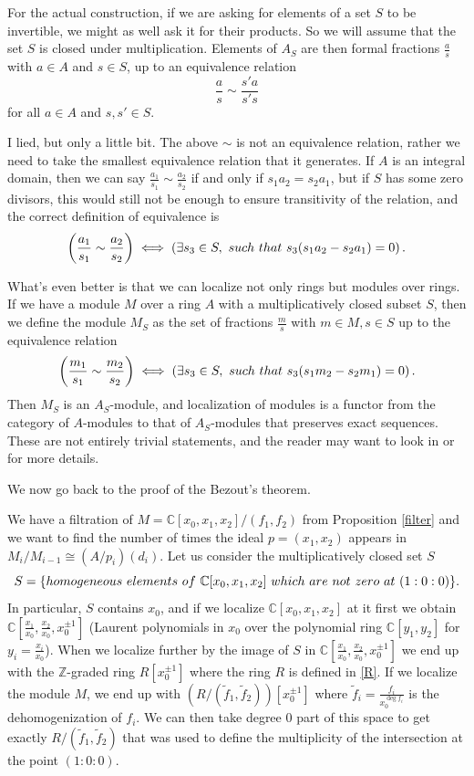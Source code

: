 \documentclass[11pt]{article}
\numberwithin{equation}{section}
\numberwithin{footnote}{section}
\newcommand{\blue}{\color{blue}}
\newcommand{\Z}{{\mathbb Z}}
\newcommand{\C}{{\mathbb C}}
\begin{document}
For the actual construction, if we are asking for elements of a set $S$ to be invertible, we might as well ask it for their products. So we will assume that the set $S$ is closed under multiplication. Elements of $A_S$ are then formal fractions $\frac as$ with $a\in A$ and $s\in S$, up to an equivalence relation
$$
\frac as \sim \frac {s'a}{s's}
$$
for all $a\in A$ and $s,s'\in S$.

\smallskip
{\blue I lied, but only a little bit.} The above $\sim$ is not an equivalence relation, rather we need to take the smallest equivalence relation that it generates. If $A$ is an integral domain, then we can say $\frac {a_1}{s_1} \sim \frac {a_2}{s_2}$ if and only if $s_1a_2 = s_2a_1$, but if $S$ has some zero divisors, this would still not be enough to ensure transitivity of the relation, and the correct definition of equivalence is
\begin{align*}
\left(\frac {a_1}{s_1} \sim \frac {a_2}{s_2}\right) \iff \left( \exists s_3\in S,~{\rm such~that~}s_3(s_1a_2 - s_2a_1)=0   \right).
\end{align*}

\smallskip
What's even better is that we can localize not only rings but modules over rings. If we have a module $M$ over a ring $A$ with a multiplicatively closed subset $S$, then we define the module $M_S$ as the set of fractions $\frac ms$ with $m\in M, s\in S$ up to the equivalence relation 
\begin{align}\label{locm}
\left(\frac {m_1}{s_1} \sim \frac {m_2}{s_2}\right) \iff \left( \exists s_3\in S,~{\rm such~that~}s_3(s_1m_2 - s_2m_1)=0   \right).
\end{align}
Then $M_S$ is an $A_S$-module, and localization of modules is a functor from the category of $A$-modules to that of $A_S$-modules that preserves exact sequences. These are not entirely trivial statements, and the reader may want to look in \cite{AM} or \cite{Eisenbud} for more details.

\smallskip{\blue \hrule}

\smallskip
We now go back to the proof of the Bezout's theorem. 

\smallskip
We have a filtration of $M = \C[x_0,x_1,x_2]/(f_1,f_2)$ from Proposition \ref{filter} and we want to find the number of times the ideal $p=(x_1,x_2)$ appears in $M_i/M_{i-1} \cong (A/p_i)(d_i)$. Let us consider the multiplicatively closed set $S$
$$
S=\{{\rm homogeneous~elements~of~}\C[x_0,x_1,x_2]{\rm~ which ~are~ not~ zero~at~} (1:0:0)\}.
$$
In particular, $S$ contains $x_0$, and if we localize $\C[x_0,x_1,x_2]$ at it first we obtain $\C[\frac {x_1}{x_0},\frac {x_2}{x_0},x_0^{\pm 1}]$ (Laurent polynomials in $x_0$ over the polynomial ring $\C[y_1,y_2]$ for $y_i=\frac {x_i}{x_0}$). When we localize further by the image of $S$ in $\C[\frac {x_1}{x_0},\frac {x_2}{x_0},x_0^{\pm 1}]$ we end up with the $\Z$-graded ring $R[x_0^{\pm 1}]$ where the ring $R$ is defined in \eqref{R}.
If we localize the module $M$, we end up with $(R/(\tilde f_1,\tilde f_2))[x_0^{\pm 1}]$ where $\tilde f_i = \frac {f_i}{x_0^{\deg f_i}}$ is the dehomogenization of $f_i$. We can then take degree $0$ part of this space to get exactly $R/(\tilde f_1,\tilde f_2)$ that was used to define the multiplicity of the intersection at the point $(1:0:0)$.
\end{document}
